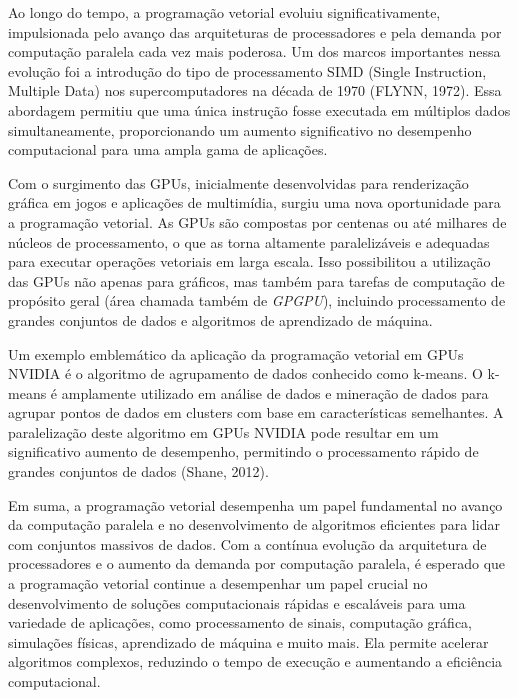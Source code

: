 \documentclass[12pt,
openright, 
oneside, %
a4paper,    %
brazil]{facom-ufu-abntex2}
\begin{document}
Ao longo do tempo, a programação vetorial evoluiu significativamente, impulsionada pelo avanço das arquiteturas de processadores e pela demanda por computação paralela cada vez mais poderosa. Um dos marcos importantes nessa evolução foi a introdução do tipo de processamento SIMD (Single Instruction, Multiple Data) nos supercomputadores na década de 1970 (FLYNN, 1972). Essa abordagem permitiu que uma única instrução fosse executada em múltiplos dados simultaneamente, proporcionando um aumento significativo no desempenho computacional para uma ampla gama de aplicações.

Com o surgimento das GPUs, inicialmente desenvolvidas para renderização gráfica em jogos e aplicações de multimídia, surgiu uma nova oportunidade para a programação vetorial. As GPUs são compostas por centenas ou até milhares de núcleos de processamento, o que as torna altamente paralelizáveis e adequadas para executar operações vetoriais em larga escala. Isso possibilitou a utilização das GPUs não apenas para gráficos, mas também para tarefas de computação de propósito geral (área chamada também de \textit{GPGPU}), incluindo processamento de grandes conjuntos de dados e algoritmos de aprendizado de máquina.

Um exemplo emblemático da aplicação da programação vetorial em GPUs NVIDIA é o algoritmo de agrupamento de dados conhecido como k-means. O k-means é amplamente utilizado em análise de dados e mineração de dados para agrupar pontos de dados em clusters com base em características semelhantes. A paralelização deste algoritmo em GPUs NVIDIA pode resultar em um significativo aumento de desempenho, permitindo o processamento rápido de grandes conjuntos de dados (Shane, 2012).

Em suma, a programação vetorial desempenha um papel fundamental no avanço da computação paralela e no desenvolvimento de algoritmos eficientes para lidar com conjuntos massivos de dados. Com a contínua evolução da arquitetura de processadores e o aumento da demanda por computação paralela, é esperado que a programação vetorial continue a desempenhar um papel crucial no desenvolvimento de soluções computacionais rápidas e escaláveis para uma variedade de aplicações, como processamento de sinais, computação gráfica, simulações físicas, aprendizado de máquina e muito mais. Ela permite acelerar algoritmos complexos, reduzindo o tempo de execução e aumentando a eficiência computacional.

\end{document}
